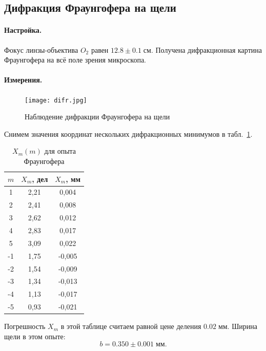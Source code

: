 \documentclass[a4paper, 12pt]{article}
\begin{document}
\newpage

\subsection{Дифракция Фраунгофера на щели}

\paragraph{Настройка.}

Фокус линзы-объектива $ O_2 $ равен $ 12.8\pm 0.1\; см $.
Получена дифракционная картина Фраунгофера на всё поле зрения микроскопа. 

\paragraph{Измерения.}

\begin{figure}[h!]
	\centering
	\texttt{[image: difr.jpg]}
	\caption{Наблюдение дифракции Фраунгофера на щели}
	\label{fig:fraungDif}
\end{figure}

Снимем значения координат нескольких дифракционных минимумов в табл.~\ref{tab:Фраунгофер}.
\begin{table}[h]
	\centering
	\begin{tabular}{|c|c|c|}
    \hline
    $m$  & $X_m$, дел & $X_m$, мм  \\ \hline
    1  & 2,21  & 0,004  \\ \hline
    2  & 2,41  & 0,008  \\ \hline
    3  & 2,62  & 0,012  \\ \hline
    4  & 2,83  & 0,017  \\ \hline
    5  & 3,09  & 0,022  \\ \hline
    -1 & 1,75  & -0,005 \\ \hline
    -2 & 1,54  & -0,009 \\ \hline
    -3 & 1,34  & -0,013 \\ \hline
    -4 & 1,13  & -0,017 \\ \hline
    -5 & 0,93  & -0,021 \\ \hline
    \end{tabular}
	\label{tab:Фраунгофер}
	\caption{$ X_m (m) $ для опыта Фраунгофера }
\end{table}

Погрешность $ X_m $ в этой таблице считаем равной цене деления $ 0.02\; мм $. Ширина щели в этом опыте:
\begin{equation*}\label{key}
	b = 0.350 \pm 0.001 \; мм.
\end{equation*}
\end{document}
